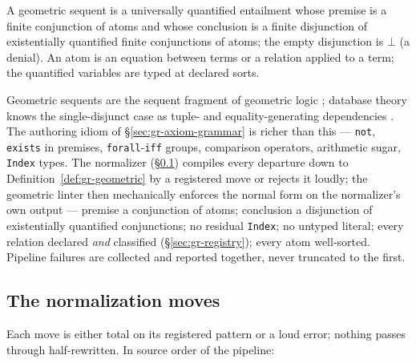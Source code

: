 \begin{definition}
\label{def:gr-geometric}
A geometric sequent is a universally quantified entailment whose
premise is a finite conjunction of atoms and whose conclusion is a
finite disjunction of existentially quantified finite conjunctions of
atoms; the empty disjunction is $\bot$ (a denial). An atom is an
equation between terms or a relation applied to a term; the
quantified variables are typed at declared sorts.
\end{definition}

\noindent Geometric sequents are the sequent fragment of geometric
logic \cite[Part~D1]{johnstone2002}; database theory knows the
single-disjunct case as tuple- and equality-generating dependencies
\cite{fagin2005data}. The authoring idiom of
\S\ref{sec:gr-axiom-grammar} is richer than this — \texttt{not}, \texttt{exists} in premises,
\texttt{forall}-\texttt{iff} groups, comparison operators, arithmetic
sugar, \texttt{Index} types. The normalizer
(\S\ref{sec:gr-normalize}) compiles every departure down to
Definition~\ref{def:gr-geometric} by a registered move or rejects it
loudly; the geometric linter then mechanically enforces the normal
form on the normalizer's own output — premise a conjunction of atoms;
conclusion a disjunction of existentially quantified conjunctions; no
residual \texttt{Index}; no untyped literal; every relation declared
\emph{and} classified (\S\ref{sec:gr-registry}); every atom
well-sorted. Pipeline failures are collected and reported together,
never truncated to the first.

\subsection{The normalization moves}
\label{sec:gr-normalize}

Each move is either total on its registered pattern or a loud error;
nothing passes through half-rewritten. In source order of the
pipeline:

